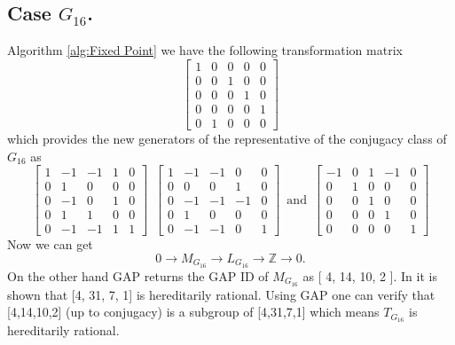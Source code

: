 \documentclass{article}
\theoremstyle{plain}
\theoremstyle{definition}
\newcommand{\Z}{\ensuremath{\mathbb{Z}}}
\newcommand{\tand}{\ensuremath{\,\,\, \text{and} \,\,\,}}
\newcommand{\exactseq}[1]{\ensuremath{0 \longrightarrow M_{#1} \longrightarrow L_{#1} \longrightarrow \Z \longrightarrow 0}}
\begin{document}
\subsection{Case $G_{16}$.}
Algorithm \ref{alg:Fixed Point} we have the following transformation matrix 
$$
 \left[ \begin {array}{ccccc} 1&0&0&0&0\\ 0&0&1&0&0
\\ 0&0&0&1&0\\ 0&0&0&0&1
\\ 0&1&0&0&0\end {array} \right] 
$$
which provides the new generators of the representative of the conjugacy class of $G_{16}$ as
$$
\left[ \begin {array}{cccc|c} 1&-1&-1&1&0\\  0&1&0&0&0
\\  0&-1&0&1&0\\  0&1&1&0&0
\\ \hline 0&-1&-1&1&1\end {array} \right] 
\,\,\,
 \left[ \begin {array}{cccc|c} 1&-1&-1&0&0\\  0&0&0&1&0
\\  0&-1&-1&-1&0\\  0&1&0&0&0
\\ \hline 0&-1&-1&0&1\end {array} \right] 
\tand
 \left[ \begin {array}{cccc|c} -1&0&1&-1&0\\  0&1&0&0&0
\\  0&0&1&0&0\\  0&0&0&1&0
\\ \hline 0&0&0&0&1\end {array} \right] 
$$
Now we can get 
$$\exactseq{G_{16}}.$$
On the other hand GAP returns the GAP ID of $M_{G_{16}}$  as [ 4, 14, 10, 2 ].
In \cite{Nicole1} it is shown that [4, 31, 7, 1] is hereditarily rational. Using GAP one can verify that [4,14,10,2] (up to conjugacy) is a subgroup of [4,31,7,1] which means $T_{G_{16}}$ is hereditarily rational.\\
\\
\end{document}
